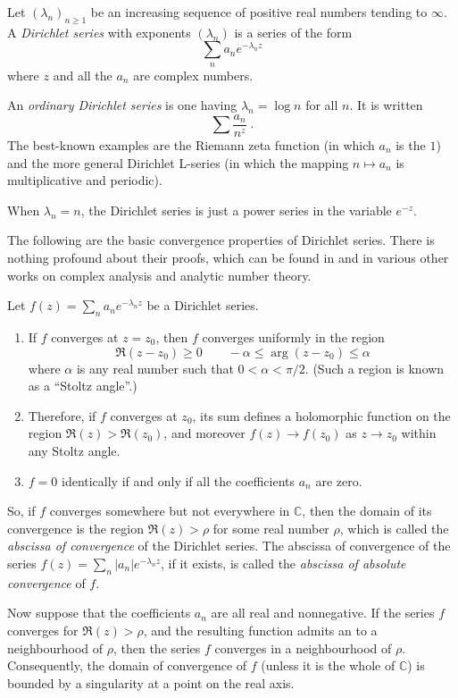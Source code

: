 \documentclass[12pt]{article}
\newcommand*{\C}{\mathbb{C}}
\begin{document}

Let $(\lambda_n)_{n\ge 1}$ be an increasing sequence of
positive real numbers tending to $\infty$.
A \emph{Dirichlet series} with exponents $(\lambda_n)$ is
a series of the form
$$\sum_n a_n e^{-\lambda_nz}$$
where $z$ and all the $a_n$ are complex numbers.

An \emph{ordinary Dirichlet series} is one having $\lambda_n=\log n$
for all $n$.
It is written
$$\sum\frac{a_n}{n^z}\;.$$
The best-known examples are the Riemann zeta function (in which $a_n$
is the  $1$) and the more general Dirichlet L-series
(in which the mapping $n\mapsto a_n$ is multiplicative and periodic).

When $\lambda_n=n$, the Dirichlet series is just a power series
in the variable $e^{-z}$.

The following are the basic convergence properties of Dirichlet series.
There is nothing profound about their proofs, which can be found
in \cite{cite:serre_arithm_course_vi} and in various other works on complex analysis and analytic
number theory.

Let $f(z)=\sum_n a_n e^{-\lambda_nz}$ be a Dirichlet series.
\begin{enumerate}
\item
If $f$ converges at $z=z_0$, then $f$ converges uniformly in the region
$$\Re(z-z_0)\ge 0\qquad -\alpha\le\arg(z-z_0)\le \alpha$$
where $\alpha$ is any real number such that $0<\alpha<\pi/2$.
(Such a region is known as a ``Stoltz angle''.)
\item Therefore, if $f$ converges at $z_0$, its sum defines a holomorphic
function on the region $\Re(z)>\Re(z_0)$, and moreover $f(z)\to f(z_0)$
as $z\to z_0$ within any Stoltz angle.
\item $f=0$ identically if and only if all the coefficients $a_n$ are zero.
\end{enumerate}
So, if $f$ converges somewhere but not everywhere in $\C$, then
the domain of its convergence is the region $\Re(z)>\rho$ for
some real number $\rho$, which is called the \emph{abscissa of convergence}
of the Dirichlet series.
The abscissa of convergence of the series
$f(z)=\sum_n |a_n| e^{-\lambda_nz}$, if it exists,
is called the \emph{abscissa of absolute convergence} of $f$.

Now suppose that the coefficients $a_n$ are all real and nonnegative.
If the series $f$ converges for $\Re(z)>\rho$, and the resulting function
admits an  to a neighbourhood of $\rho$,
then the series $f$ converges in a neighbourhood of $\rho$.
Consequently, the domain of convergence of $f$ (unless it is the whole
of $\C$) is bounded by a singularity at a point on the real axis.
\end{document}
